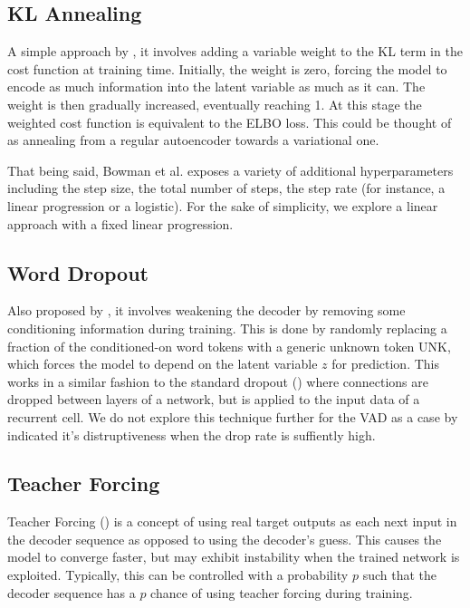\documentclass[12pt,twoside]{report}
\begin{document}
\subsection{KL Annealing}

A simple approach by \cite{bowman_generating_2015}, it involves adding a variable weight to the KL term in the cost function at training time. Initially, the weight is zero, forcing the model to encode as much information into the latent variable as much as it can. The weight is then gradually increased, eventually reaching 1. At this stage the weighted cost function is equivalent to the ELBO loss. This could be thought of as annealing from a regular autoencoder towards a variational one.

That being said, Bowman et al. exposes a variety of additional hyperparameters including the step size, the total number of steps, the step rate (for instance, a linear progression or a logistic). For the sake of simplicity, we explore a linear approach with a fixed linear progression.

\subsection{Word Dropout}
Also proposed by \cite{bowman_generating_2015}, it involves weakening the decoder by removing some conditioning information during training. This is done by randomly replacing a fraction of the conditioned-on word tokens with a generic unknown token UNK, which forces the model to depend on the latent variable $z$ for prediction. This works in a similar fashion to the standard dropout (\cite{srivastava_dropout:_2014}) where connections are dropped between layers of a network, but is applied to the input data of a recurrent cell. We do not explore this technique further for the VAD as a case by \cite{bowman_generating_2015} indicated it's distruptiveness when the drop rate is suffiently high.

\subsection{Teacher Forcing}

Teacher Forcing (\cite{williams_learning_1989}) is a concept of using real target outputs as each next input in the decoder sequence as opposed to using the decoder's guess. This causes the model to converge faster, but may exhibit instability when the trained network is exploited. Typically, this can be controlled with a probability $p$ such that the decoder sequence has a $p$ chance of using teacher forcing during training.
\end{document}
